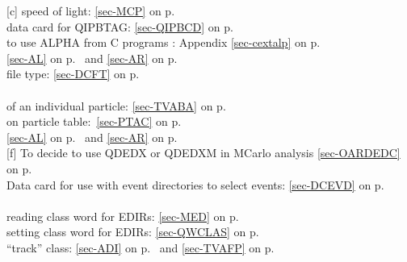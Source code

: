  
 [c] speed of light: \ref{sec-MCP} on p.~\pageref{sec-MCP}\\
 data card for QIPBTAG: \ref{sec-QIPBCD} on p.~\pageref{sec-QIPBCD} \\
 to use ALPHA from C  programs : Appendix \ref{sec-cextalp} on p.~\pageref{sec-cextalp}\\
 \ref{sec-AL} on p.~\pageref{sec-AL} and
 \ref{sec-AR} on p.~\pageref{sec-AR}\\
 file type: \ref{sec-DCFT} on p.~\pageref{sec-DCFT}\\
 \\
 \mysubitem of an individual particle: \ref{sec-TVABA} on p.~\pageref{sec-TVABA}\\
 \mysubitem on particle table:~\ref{sec-PTAC} on p.~\pageref{sec-PTAC}\\
 \ref{sec-AL} on p.~\pageref{sec-AL} and
 \ref{sec-AR} on p.~\pageref{sec-AR}\\
 [f] To decide to use QDEDX or QDEDXM in MCarlo analysis
 \ref{sec-OARDEDC} on p.~\pageref{sec-OARDEDC}\\
 Data card for use with event directories to select events:
 \ref{sec-DCEVD} on p.~\pageref{sec-DCEVD}\\
 \\
 \mysubitem reading class word for EDIRs: \ref{sec-MED} on p.~\pageref{sec-MED}\\
 \mysubitem setting class word for EDIRs: \ref{sec-QWCLAS} on p.~\pageref{sec-QWCLAS}\\
 \mysubitem ``track'' class: \ref{sec-ADI} on p.~\pageref{sec-ADI} and \ref{sec-TVAFP} on p.~\pageref{sec-TVAFP}
 
